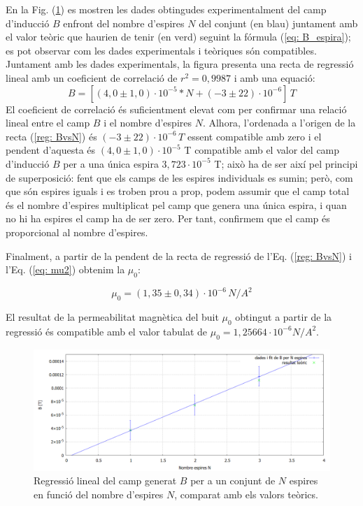 \documentclass[11pt]{article}
\numberwithin{equation}{section}
\numberwithin{figure}{section}
\numberwithin{table}{section}
\begin{document}
En la Fig. (\ref{fig:BvsN}) es mostren les dades obtingudes experimentalment del camp d'inducció $B$ enfront del nombre d'espires $N$ del conjunt (en blau) juntament amb el valor teòric que haurien de tenir (en verd) seguint la fórmula (\ref{eq: B_espira}); es pot observar com les dades experimentals i teòriques són compatibles.
Juntament amb les dades experimentals, la figura presenta una recta de regressió lineal amb un coeficient de correlació de $r^2=0,9987$ i amb una equació:
\begin{equation} \label{reg: BvsN}
    B = [(4,0 \pm 1,0) \cdot10^{-5} *N +(-3 \pm 22)\cdot10^{-6}] \, T
\end{equation}
El coeficient de correlació és suficientment elevat com per confirmar una relació lineal entre el camp $B$ i el nombre d'espires $N$. Alhora, l'ordenada a l'origen de la recta (\ref{reg: BvsN}) és $(-3 \pm 22)\cdot10^{-6} \, T$ essent compatible amb zero i el pendent d'aquesta és $(4,0 \pm 1,0)\cdot10^{-5}$ T compatible amb el valor del camp d'inducció $B$ per a una única espira $3,723\cdot10^{-5}$ T; això ha de ser així pel principi de superposició: fent que els camps de les espires individuals es sumin; però, com que són espires iguals i es troben prou a prop, podem assumir que el camp total és el nombre d'espires multiplicat pel camp que genera una única espira, i quan no hi ha espires el camp ha de ser zero. Per tant, confirmem que el camp és proporcional al nombre d'espires.

Finalment, a partir de la pendent de la recta de regressió de l'Eq. (\ref{reg: BvsN}) i l'Eq. (\ref{eq: mu2}) obtenim la $\mu_0$:

\[
\boxed{\mu_0=(1,35\pm0,34)\cdot10^{-6} \, N/A^2}
\]

El resultat de la permeabilitat magnètica del buit $\mu_0$ obtingut a partir de la regressió és compatible amb el valor tabulat de $\mu_0 = 1,25664\cdot 10^{-6} N/A^2$.

\begin{figure}[H]
    \centering
    \includegraphics[width=1\linewidth]{BvsN.PNG}
    \caption{Regressió lineal del camp generat $B$ per a un conjunt de $N$ espires en funció del nombre d'espires $N$, comparat amb els valors teòrics.}
    \label{fig:BvsN}
\end{figure}
\end{document}
